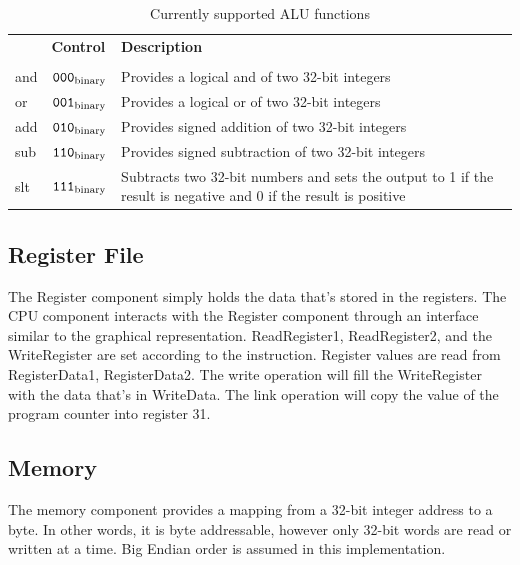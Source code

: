 \documentclass[]{spie}
\begin{document}
\begin{table}[H]
	\begin{center}
	\begin{tabular}{|p{1.0in}|p{1.0in}|p{3.2in}|}
		\hline
		\rowcolor[gray]{.9}{\bf Operation} &{\bf Control}  & {\bf Description} \\
		\rowcolor[gray]{.9} { } &{ } & { }   \\
		\hline
		and & ${\tt 000_{\rm binary}}$ & Provides a logical and of two 32-bit integers \\
		\hline
		or & ${\tt 001_{\rm binary}}$ & Provides a logical or of two 32-bit integers \\
		\hline
		add & ${\tt 010_{\rm binary}}$ & Provides signed addition of two 32-bit integers \\
		\hline
		sub & ${\tt 110_{\rm binary}}$ & Provides signed subtraction of two 32-bit integers \\
		\hline
		slt & ${\tt 111_{\rm binary}}$ & Subtracts two 32-bit numbers and sets the output to 1 if the result is
		negative and 0 if the result is positive \\
		\hline
	\end{tabular}
	\end {center}
	\caption{\label{tab:ALU} Currently supported ALU functions}
\end{table}

\subsection{Register File}
The Register component simply holds the data that's stored in the registers. The CPU component interacts with the 
Register component through an interface similar to the graphical representation. ReadRegister1, ReadRegister2, and
the WriteRegister are set according to the instruction. Register values are read from RegisterData1, RegisterData2. 
The write operation will fill the WriteRegister with the data that's in WriteData. The link operation will copy the
value of the program counter into register 31.

\subsection{Memory}
The memory component provides a mapping from a 32-bit integer address to a byte. In other words, it is byte addressable, however only 32-bit 
words are read or written at a time. Big Endian order is assumed in this implementation. 
\end{document}
